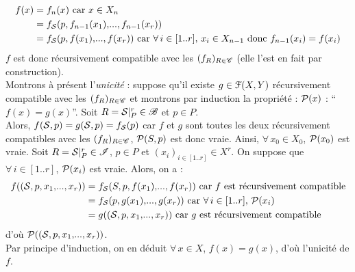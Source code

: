 \begin{Preuve}
								\begin{align*}
									f(x) & = f_n(x) \text{ car } x\in X_n \\
										& = f_\cal{S}(p,f_{n-1}(x_1),\!...,f_{n-1}(x_r)) \\
										& = f_\cal{S}(p,f(x_1),\!...,f(x_r)) \text{ car } \forall\,i\in [1..r], \,x_i\in X_{n-1} \text{ donc } f_{n-1}(x_i) = f(x_i)
								\end{align*}
					\(f\) est donc récursivement compatible avec les \((f_R)_{R\in\scr{C}}\) (elle l'est en fait par construction). \\[3mm]
					\ii Montrons à présent l'\emph{unicité} : suppose qu'il existe \(g \in \escr{F}(X,Y)\) récursivement compatible avec les \((f_R)_{R\in\scr{C}}\) et montrons par induction la propriété : \(\cal{P}(x)\) : ``\(f(x) = g(x)\)''. \nt
						\bdot Soit \(R=\cal{S}\constr{r}{P} \in \scr{B}\) et \(p\in P\). \\
						Alors, \(f(\cal{S},p) = g(\cal{S},p) = f_\cal{S}(p)\) car \(f\) et \(g\) sont toutes les deux récursivement compatibles avec les \((f_R)_{R\in\scr{C}}\), \(\cal{P}(S,p)\) est donc vraie. Ainsi, \(\forall\,x_0 \in X_0\), \(\cal{P}(x_0)\) est vraie. \nt
						\bdot Soit \(R=\cal{S}\constr{r}{P} \in \scr{I}\), \(p\in P\) et \((x_i)_{i\in[1..r]} \in X^r\). On suppose que \(\forall\,i\in [1..r]\), \(\cal{P}(x_i)\) est vraie. Alors, on a :
							\begin{align*}
								f((\cal{S},p,x_1,\!...,x_r)) & = f_\cal{S}(S,p,f(x_1),\!...,f(x_r)) \text{ car } f \text{ est récursivement compatible} \\
								& = f_\cal{S}(p,g(x_1),\!...,g(x_r)) \text{ car } \forall\,i\in [1..r], \,\cal{P}(x_i) \\
								& = g((\cal{S},p,x_1,\!...,x_r)) \text{ car } g \text{ est récursivement compatible}
							\end{align*}
						d'où \(\cal{P}((\cal{S},p,x_1,\!...,x_r))\). \\[2mm]
						Par principe d'induction, on en déduit \(\forall\, x \in X\), \(f(x) = g(x)\), d'où l'unicité de \(f\).
			\end{Preuve}
		
